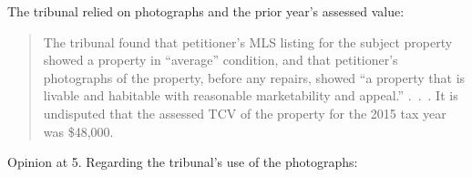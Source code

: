 \documentclass[12pt,\documentclassflag]{michiganCourtOfAppealsBrief}
\begin{document}

The tribunal relied on photographs and the prior year's assessed value:

\begin{quote}
The tribunal found that
petitioner's MLS listing for the subject property showed a property in ``average'' condition, and
that petitioner's photographs of the property, before any repairs, showed ``a property that is livable
and habitable with reasonable marketability and appeal.'' .~.~.
It is undisputed that the assessed
TCV of the property for the 2015 tax year was \$48,000.
\end{quote}
Opinion at 5. Regarding the tribunal's use of the photographs:%
\end{document}
